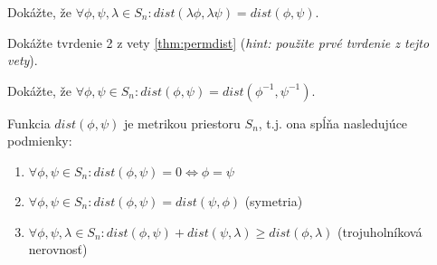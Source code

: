 \begin{exercise}
\label{exer:permdist1}
Dokážte, že $\forall \phi, \psi, \lambda \in S_n: dist(\lambda\phi, \lambda\psi) = dist(\phi, \psi)$.
\end{exercise}

\begin{exercise}
\label{exer:permdist2}
Dokážte tvrdenie 2 z vety \ref{thm:permdist} (\emph{hint: použite prvé tvrdenie z tejto vety}).
\end{exercise}


\begin{exercise}
Dokážte, že $\forall \phi, \psi \in S_n: dist(\phi, \psi) = dist(\phi^{-1}, \psi^{-1})$.
\end{exercise}



\begin{theorem}
    Funkcia $dist(\phi, \psi)$ je metrikou priestoru $S_n$, t.j. ona spĺňa nasledujúce podmienky:
    \begin{enumerate}
        \item $ \forall \phi, \psi \in S_n: dist(\phi, \psi) = 0 \Leftrightarrow \phi = \psi$
        \item $ \forall \phi, \psi \in S_n: dist(\phi, \psi) = dist(\psi, \phi)$ (symetria)
        \item $ \forall \phi, \psi, \lambda \in S_n: dist(\phi, \psi) + dist(\psi, \lambda) \geq dist(\phi, \lambda)$ (trojuholníková nerovnosť)  
    \end{enumerate}
\end{theorem}

